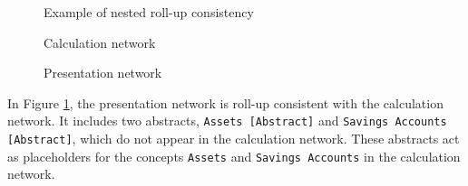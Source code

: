\begin{figure}[H]
    \caption{Example of nested roll-up consistency}
    \label{fig:example_roll_up_consistency}
    \begin{minipage}{0.8\textwidth}
        \caption{Calculation network}
    \end{minipage}
    \begin{minipage}{0.8\textwidth}
        \caption{Presentation network}
    \end{minipage}
\end{figure}




In Figure \ref{fig:example_roll_up_consistency}, the presentation network is roll-up consistent with the calculation network.  
It includes two abstracts, \texttt{Assets [Abstract]} and \texttt{Savings Accounts [Abstract]}, which do not appear in the calculation network.  
These abstracts act as placeholders for the concepts \texttt{Assets} and \texttt{Savings Accounts} in the calculation network.

